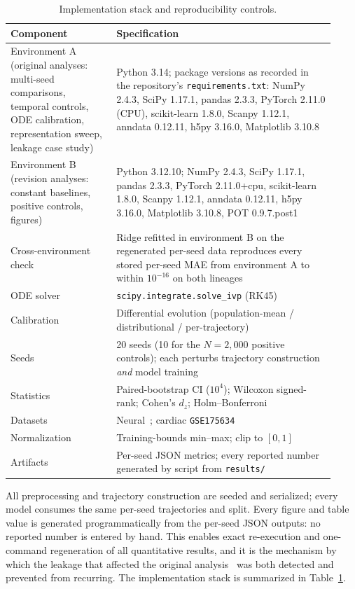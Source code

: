\documentclass[pdflatex,sn-mathphys-num]{sn-jnl}
\theoremstyle{thmstyleone}%
\theoremstyle{thmstyletwo}%
\theoremstyle{thmstylethree}%
\begin{document}
\begin{table}[!htbp]
\centering
\caption{\scriptsize Implementation stack and reproducibility controls.}
\label{tab:impl_repro}
\vspace{-2mm}
\scriptsize
\setlength{\tabcolsep}{4pt}
\begin{tabular}{p{0.30\linewidth} p{0.62\linewidth}}
\hline \toprule
\textbf{Component} & \textbf{Specification} \\
\hline
Environment A (original analyses: multi-seed comparisons, temporal controls, ODE calibration, representation sweep, leakage case study) & Python 3.14; package versions as recorded in the repository's \texttt{requirements.txt}: NumPy 2.4.3, SciPy 1.17.1, pandas 2.3.3, PyTorch 2.11.0 (CPU), scikit-learn 1.8.0, Scanpy 1.12.1, anndata 0.12.11, h5py 3.16.0, Matplotlib 3.10.8 \\
Environment B (revision analyses: constant baselines, positive controls, figures) & Python 3.12.10; NumPy 2.4.3, SciPy 1.17.1, pandas 2.3.3, PyTorch 2.11.0+cpu, scikit-learn 1.8.0, Scanpy 1.12.1, anndata 0.12.11, h5py 3.16.0, Matplotlib 3.10.8, POT 0.9.7.post1 \\
Cross-environment check & Ridge refitted in environment B on the regenerated per-seed data reproduces every stored per-seed MAE from environment A to within $10^{-16}$ on both lineages \\
ODE solver & \texttt{scipy.integrate.solve\_ivp} (RK45) \\
Calibration & Differential evolution (population-mean / distributional / per-trajectory) \\
Seeds & 20 seeds (10 for the $N=2{,}000$ positive controls); each perturbs trajectory construction \emph{and} model training \\
Statistics & Paired-bootstrap CI ($10^4$); Wilcoxon signed-rank; Cohen's $d_z$; Holm--Bonferroni \\
Datasets & Neural~\cite{jerber2021population}; cardiac \texttt{GSE175634}~\cite{elorbany2022single} \\
Normalization & Training-bounds min--max; clip to $[0,1]$ \\
Artifacts & Per-seed JSON metrics; every reported number generated by script from \texttt{results/} \\
\hline \toprule
\end{tabular}
\label{stack}
\vspace{-3mm}
\end{table}

All preprocessing and trajectory construction are seeded and serialized; every model consumes the same per-seed trajectories and split. Every figure and table value is generated programmatically from the per-seed JSON outputs: no reported number is entered by hand. This enables exact re-execution and one-command regeneration of all quantitative results, and it is the mechanism by which the leakage that affected the original analysis~\cite{kanu2026transformer} was both detected and prevented from recurring. The implementation stack is summarized in Table~\ref{stack}.
\end{document}
